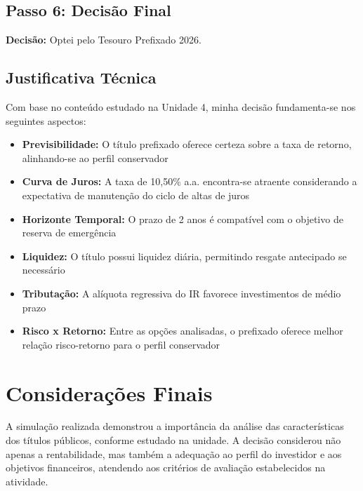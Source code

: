 \documentclass[12pt, a4paper]{article}
\begin{document}
\subsection*{Passo 6: Decisão Final}
\textbf{Decisão:} Optei pelo Tesouro Prefixado 2026.

\subsection*{Justificativa Técnica}
Com base no conteúdo estudado na Unidade 4, minha decisão fundamenta-se nos seguintes aspectos:

\begin{itemize}
    \item \textbf{Previsibilidade:} O título prefixado oferece certeza sobre a taxa de retorno, alinhando-se ao perfil conservador
    
    \item \textbf{Curva de Juros:} A taxa de 10,50\% a.a. encontra-se atraente considerando a expectativa de manutenção do ciclo de altas de juros
    
    \item \textbf{Horizonte Temporal:} O prazo de 2 anos é compatível com o objetivo de reserva de emergência
    
    \item \textbf{Liquidez:} O título possui liquidez diária, permitindo resgate antecipado se necessário
    
    \item \textbf{Tributação:} A alíquota regressiva do IR favorece investimentos de médio prazo
    
    \item \textbf{Risco x Retorno:} Entre as opções analisadas, o prefixado oferece melhor relação risco-retorno para o perfil conservador
\end{itemize}

\section{Considerações Finais}

A simulação realizada demonstrou a importância da análise das características dos títulos públicos, conforme estudado na unidade. A decisão considerou não apenas a rentabilidade, mas também a adequação ao perfil do investidor e aos objetivos financeiros, atendendo aos critérios de avaliação estabelecidos na atividade.
\end{document}
